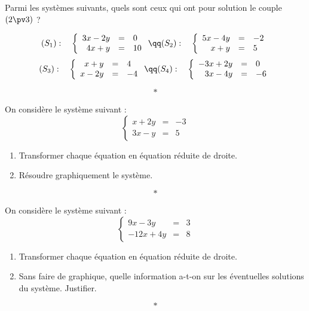 \documentclass[11pt,openright,twoside,french]{book}
\begin{document}

\exo Parmi les systèmes suivants, quels sont ceux qui ont pour solution le couple $(2 \pv 3)$ ?

\[
(S_1) :\quad \left\{\begin{array}{rcl}
                                3x - 2y & = & 0 \\
                                4x + y & = & 10
                            \end{array}
                    \right. \qq
(S_2) :\quad \left\{\begin{array}{rcl}
                                5x - 4y & = & -2 \\
                                x + y & = & 5
                            \end{array}
                    \right.
\]
\[
(S_3) :\quad \left\{\begin{array}{rcl}
                                x + y & = & 4 \\
                                x - 2y & = & -4
                            \end{array}
                    \right. \qq
(S_4) :\quad \left\{\begin{array}{rcl}
                                -3x + 2y & = & 0 \\
                                3x - 4y & = & -6
                            \end{array}
                    \right.
\]

\[*\]

\exo On considère le système suivant :
\[\left\{\begin{array}{rcl}
                x + 2y & = & -3 \\
                3x - y & = & 5
            \end{array}
    \right.
\]
\begin{enumerate}
    \item Transformer chaque équation en équation réduite de droite.
    \item Résoudre graphiquement le système.
\end{enumerate}\[*\]

\exo On considère le système suivant :
\[\left\{\begin{array}{rcl}
                9x - 3y & = & 3 \\
                -12x + 4y & = & 8
            \end{array}
    \right.
\]
\begin{enumerate}
    \item Transformer chaque équation en équation réduite de droite.
    \item Sans faire de graphique, quelle information a-t-on sur les éventuelles solutions du système. Justifier.
\end{enumerate}\[*\]
\end{document}

